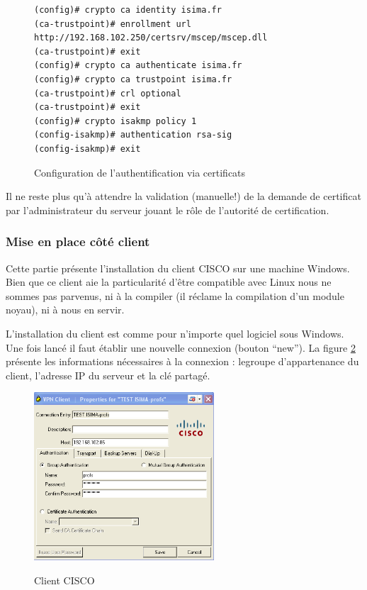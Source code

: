 \begin{figure}[H]
	\begin{center}
		\begin{minipage}{1\textwidth}
			\begin{lstlisting}[frame=trBL]
(config)# crypto ca identity isima.fr
(ca-trustpoint)# enrollment url
http://192.168.102.250/certsrv/mscep/mscep.dll
(ca-trustpoint)# exit
(config)# crypto ca authenticate isima.fr
(config)# crypto ca trustpoint isima.fr
(ca-trustpoint)# crl optional
(ca-trustpoint)# exit
(config)# crypto isakmp policy 1
(config-isakmp)# authentication rsa-sig
(config-isakmp)# exit
			\end{lstlisting}
		\end{minipage}
	\end{center}
	\caption{Configuration de l'authentification via certificats}
	\label{configuration_authentification_certificats}
\end{figure}

Il ne reste plus qu'à attendre la validation (manuelle!) de la demande de certificat par l'administrateur du serveur jouant le rôle de l'autorité de certification.

\subsubsection{Mise en place côté client}

Cette partie présente l'installation du client CISCO sur une machine Windows. Bien que ce client aie la particularité d'être compatible avec Linux nous ne sommes pas parvenus, ni à la compiler (il réclame la compilation d'un module noyau), ni à nous en servir.

L'installation du client est comme pour n'importe quel logiciel sous Windows. Une fois lancé il faut établir une nouvelle connexion (bouton ``new''). La figure \ref{VPN_CISCO} présente les informations nécessaires à la connexion : legroupe d'appartenance du client, l'adresse IP du serveur et la clé partagé.

\begin{figure}[H]
	\begin{center}
		\includegraphics[width=0.6\textwidth]{partie_2/screen_windows/client_cisco.png}\\
	\end{center}
	\caption{Client CISCO}
	\label{VPN_CISCO}
\end{figure}

